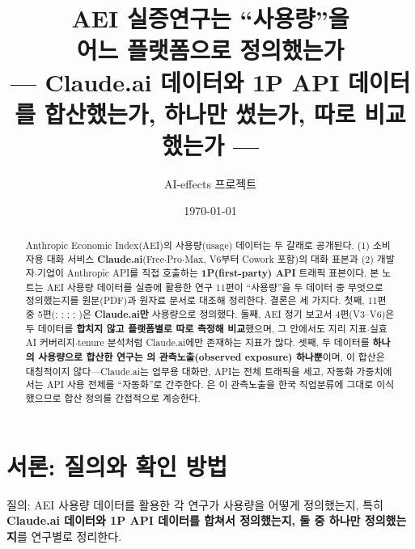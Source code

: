 \documentclass[11pt]{article}
\title{AEI 실증연구는 ``사용량''을\\[1mm]
어느 플랫폼으로 정의했는가\\[2mm]
\large --- Claude.ai 데이터와 1P API 데이터를 합산했는가, 하나만 썼는가, 따로 비교했는가 ---}
\author{AI-effects 프로젝트}
\date{\today}
\begin{document}
\maketitle

\begin{abstract}
\noindent Anthropic Economic Index(AEI)의 사용량(usage) 데이터는 두 갈래로 공개된다. (1) 소비자용 대화 서비스 \textbf{Claude.ai}(Free$\cdot$Pro$\cdot$Max, V6부터 Cowork 포함)의 대화 표본과 (2) 개발자$\cdot$기업이 Anthropic API를 직접 호출하는 \textbf{1P(first-party) API} 트래픽 표본이다. 본 노트는 AEI 사용량 데이터를 실증에 활용한 연구 11편이 ``사용량''을 두 데이터 중 무엇으로 정의했는지를 원문(PDF)과 원자료 문서로 대조해 정리한다. 결론은 세 가지다. 첫째, 11편 중 5편(\cite{handa-2025-which-economic-tasks-are}; \cite{tamkin-2025-estimating-ai-productivity-gains-from}; \cite{fan-2026-what-countries-use-ai-and}; \cite{fan-2026-aggregate-gains-from-ai}; \cite{bick-2026-what-work-does-generative})은 \textbf{Claude.ai만} 사용량으로 정의했다. 둘째, AEI 정기 보고서 4편(V3--V6)은 두 데이터를 \textbf{합치지 않고 플랫폼별로 따로 측정해 비교}했으며, 그 안에서도 지리 지표$\cdot$실효 AI 커버리지$\cdot$tenure 분석처럼 Claude.ai에만 존재하는 지표가 많다. 셋째, 두 데이터를 \textbf{하나의 사용량으로 합산한 연구는 \textcite{massenkoff-2026-labor-market-impacts-of-ai}의 관측노출(observed exposure) 하나뿐}이며, 이 합산은 대칭적이지 않다---Claude.ai는 업무용 대화만, API는 전체 트래픽을 세고, 자동화 가중치에서는 API 사용 전체를 ``자동화''로 간주한다. \textcite{kim-2026-generative-ai-korean-labor-market}은 이 관측노출을 한국 직업분류에 그대로 이식했으므로 합산 정의를 간접적으로 계승한다.
\end{abstract}

\tableofcontents

\section{서론: 질의와 확인 방법}

질의: AEI 사용량 데이터를 활용한 각 연구가 사용량을 어떻게 정의했는지, 특히 \textbf{Claude.ai 데이터와 1P API 데이터를 합쳐서 정의했는지, 둘 중 하나만 정의했는지}를 연구별로 정리한다.
\end{document}
